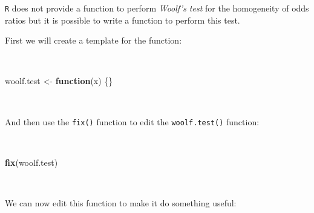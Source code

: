 \documentclass[12pt,a4paper]{book}
\newenvironment{Shaded}{\begin{snugshade}}{\end{snugshade}}
\newcommand{\ControlFlowTok}[1]{\textcolor[rgb]{0.13,0.29,0.53}{\textbf{#1}}}
\newcommand{\KeywordTok}[1]{\textcolor[rgb]{0.13,0.29,0.53}{\textbf{#1}}}
\newcommand{\NormalTok}[1]{#1}
\newcommand{\StringTok}[1]{\textcolor[rgb]{0.31,0.60,0.02}{#1}}
\theoremstyle{definition}
\theoremstyle{definition}
\theoremstyle{definition}
\theoremstyle{remark}
\begin{document}
\texttt{R} does not provide a function to perform \emph{Woolf's test}
for the homogeneity of odds ratios but it is possible to write a
function to perform this test.

First we will create a template for the function:

~

\begin{Shaded}
\begin{Highlighting}[]
\NormalTok{woolf.test <-}\StringTok{ }\ControlFlowTok{function}\NormalTok{(x) \{\}}
\end{Highlighting}
\end{Shaded}

~

And then use the \texttt{fix()} function to edit the
\texttt{woolf.test()} function:

~

\begin{Shaded}
\begin{Highlighting}[]
\KeywordTok{fix}\NormalTok{(woolf.test)}
\end{Highlighting}
\end{Shaded}

~

We can now edit this function to make it do something useful:

~
\end{document}
